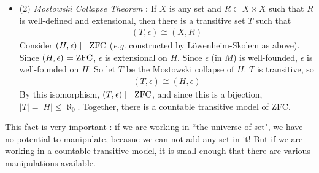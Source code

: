 \documentclass[12pt,a4paper]{article}
\newenvironment{subproof}
{\begin{changemargin}{0.5cm}{0.5cm} 
	}%
	{\end{changemargin}
}
\renewenvironment{i}
{\begin{itemize} 
	}%
	{\end{itemize}
}
\begin{document}
\begin{i}
\quad Then By construction, $\aleph_1 \in H$.
\begin{subproof}
: There is a formula $\varphi$ such that $\varphi(x)$ \emph{iff} $x$ is the least uncountable cardinal. In ZFC, $V_{\kappa} \models \exists x\,\, \varphi(x)$ but the only element that satisfies $\varphi$ in $V_{\kappa}$ is $\aleph_1$. So in the Skolem hull construction, $\aleph_1 \in Z_1 \subset H$
\end{subproof}

This implies that $H$ can not be transitive, since $\aleph_1$ has uncontable many element, but $H$ has only countably mnay element.
\s

\item[(2)] \emph{Mostowski Collapse Theorem} : If $X$ is any set and $R\subset X\times X$ such that $R$ is well-defined and extensional, then there is a transitive set $T$ such that
\begin{align*}
(T, \epsilon) \cong (X, R)
\end{align*}
Consider $(H, \epsilon) \models \text{ZFC}$ (\textit{e.g.} constructed by L\"owenheim-Skolem as above). Since $(H, \epsilon) \models \text{ZFC}$, $\epsilon$ is extensional on $H$. Since $\epsilon$ (in $M$) is well-founded, $\epsilon$ is well-founded on $H$. So let $T$ be the Mostowski collapse of $H$. $T$ is transitive, so
\begin{align*}
(T, \epsilon) \cong (H, \epsilon)
\end{align*}
By this isomorphism, $(T, \epsilon) \models \text{ZFC}$, and since this is a bijection, $|T| = |H| \leq \aleph_0$. Together, there is a countable transitive model of ZFC.
\end{i}
This fact is very important : if we are working in ``the universe of set", we have no potential to manipulate, becasue we can not add any set in it! But if we are working in a countable transitive model, it is small enough that there are various manipulations available.
\s
\end{document}
